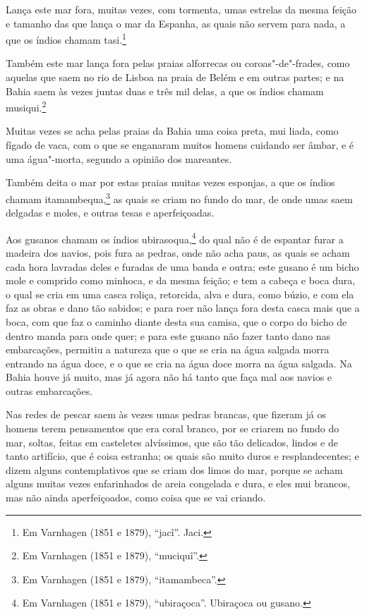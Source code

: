 Lança este mar fora, muitas vezes, com tormenta, umas estrelas da mesma feição e tamanho
das que lança o mar da Espanha, as quais não servem para nada, a que os índios chamam
tasi.\footnote{ Em Varnhagen (1851 e 1879), ``jacî''. Jaci.}

Também este mar lança fora pelas praias alforrecas ou coroas"-de"-frades, como aquelas que
saem no rio de Lisboa na praia de Belém e em outras partes; e na Bahia saem às vezes
juntas duas e três mil delas, a que os índios chamam musiqui.\footnote{ Em Varnhagen (1851
e 1879), ``muciquî''.}

Muitas vezes se acha pelas praias da Bahia uma coisa preta, mui liada, como fígado de
vaca, com o que se enganaram muitos homens cuidando ser âmbar, e é uma água"-morta, segundo
a opinião dos mareantes.

Também deita o mar por estas praias muitas vezes esponjas, a que os índios chamam
itamambequa,\footnote{ Em Varnhagen (1851 e 1879), ``itamambeca''.} as quais se criam no
fundo do mar, de onde umas saem delgadas e moles, e outras tesas e aperfeiçoadas.

Aos gusanos chamam os índios ubirasoqua,\footnote{ Em Varnhagen (1851 e 1879),
``ubiraçoca''. Ubiraçoca ou gusano.} do qual não é de espantar furar a madeira dos
navios, pois fura as pedras, onde não acha paus, as quais se acham cada hora lavradas
deles e furadas de uma banda e outra; este gusano é um bicho mole e comprido como minhoca,
e da mesma feição; e tem a cabeça e boca dura, o qual se cria em uma casca roliça,
retorcida, alva e dura, como búzio, e com ela faz as obras e dano tão sabidos; e para roer
não lança fora desta casca mais que a boca, com que faz o caminho diante desta sua camisa,
que o corpo do bicho de dentro manda para onde quer; e para este gusano não fazer tanto
dano nas embarcações, permitiu a natureza que o que se cria na água salgada morra entrando
na água doce, e o que se cria na água doce morra na água salgada. Na Bahia houve já muito,
mas já agora não há tanto que faça mal aos navios e outras embarcações.

Nas redes de pescar saem às vezes umas pedras brancas, que fizeram já os homens terem
pensamentos que era coral branco, por se criarem no fundo do mar, soltas, feitas em
casteletes alvíssimos, que são tão delicados, lindos e de tanto artifício, que é coisa
estranha; os quais são muito duros e resplandecentes; e dizem alguns contemplativos que se
criam dos limos do mar, porque se acham alguns muitas vezes enfarinhados de areia
congelada e dura, e eles mui brancos, mas não ainda aperfeiçoados, como coisa que se vai
criando.

